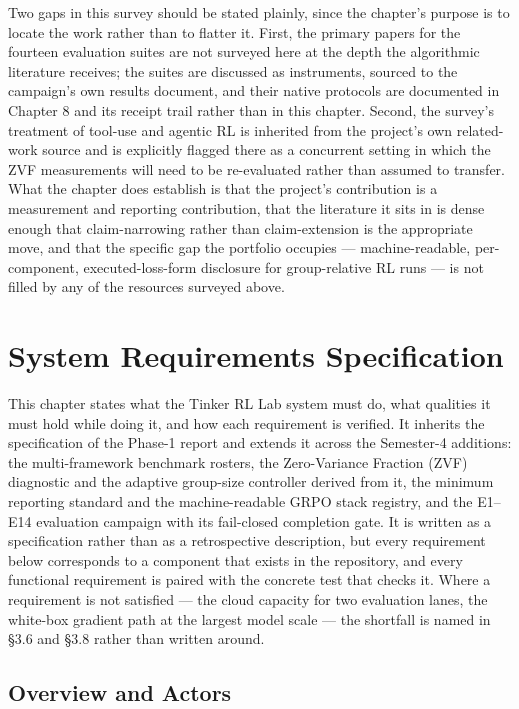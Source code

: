 \documentclass[12pt,a4paper]{report}
\begin{document}
Two gaps in this survey should be stated plainly, since the chapter's
purpose is to locate the work rather than to flatter it. First, the
primary papers for the fourteen evaluation suites are not surveyed here
at the depth the algorithmic literature receives; the suites are
discussed as instruments, sourced to the campaign's own results
document, and their native protocols are documented in Chapter 8 and its
receipt trail rather than in this chapter. Second, the survey's
treatment of tool-use and agentic RL is inherited from the project's own
related-work source and is explicitly flagged there as a concurrent
setting in which the ZVF measurements will need to be re-evaluated
rather than assumed to transfer. What the chapter does establish is that
the project's contribution is a measurement and reporting contribution,
that the literature it sits in is dense enough that claim-narrowing
rather than claim-extension is the appropriate move, and that the
specific gap the portfolio occupies --- machine-readable, per-component,
executed-loss-form disclosure for group-relative RL runs --- is not
filled by any of the resources surveyed above.



\chapter{System Requirements
Specification}\label{system-requirements-specification}

This chapter states what the Tinker RL Lab system must do, what
qualities it must hold while doing it, and how each requirement is
verified. It inherits the specification of the Phase-1 report and
extends it across the Semester-4 additions: the multi-framework
benchmark rosters, the Zero-Variance Fraction (ZVF) diagnostic and the
adaptive group-size controller derived from it, the minimum reporting
standard and the machine-readable GRPO stack registry, and the E1--E14
evaluation campaign with its fail-closed completion gate. It is written
as a specification rather than as a retrospective description, but every
requirement below corresponds to a component that exists in the
repository, and every functional requirement is paired with the concrete
test that checks it. Where a requirement is not satisfied --- the cloud
capacity for two evaluation lanes, the white-box gradient path at the
largest model scale --- the shortfall is named in §3.6 and §3.8 rather
than written around.

\section{Overview and Actors}\label{overview-and-actors}
\end{document}
